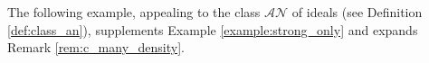 \documentclass[a4paper,11pt,fleqn]{amsart}
\newtheorem{proposition}[theorem]{Proposition}
\theoremstyle{definition}
\theoremstyle{remark}
\numberwithin{equation}{section}
\newcommand{\N}{\mathbb{N}}
\newcommand{\aA}{\mathcal{A}}
\newcommand{\iI}{\mathcal{I}}
\newcommand{\nN}{\mathcal{N}}
\newcommand{\zZ}{\mathcal{Z}}
\newcommand{\rstr}{\restriction}
\newcommand{\seqn}[1]{\big\langle#1\colon\ n\io\big\rangle}
\newcommand{\clopen}[1]{\left[#1\right]}
\newcommand{\io}{\in\omega}%
\newcommand{\erdos}{{Erd\H{o}s}}
\begin{document}
%

The following example, appealing to the class $\aA\nN$ of ideals (see Definition \ref{def:class_an}), supplements Example \ref{example:strong_only} and expands Remark \ref{rem:c_many_density}.
\end{document}
